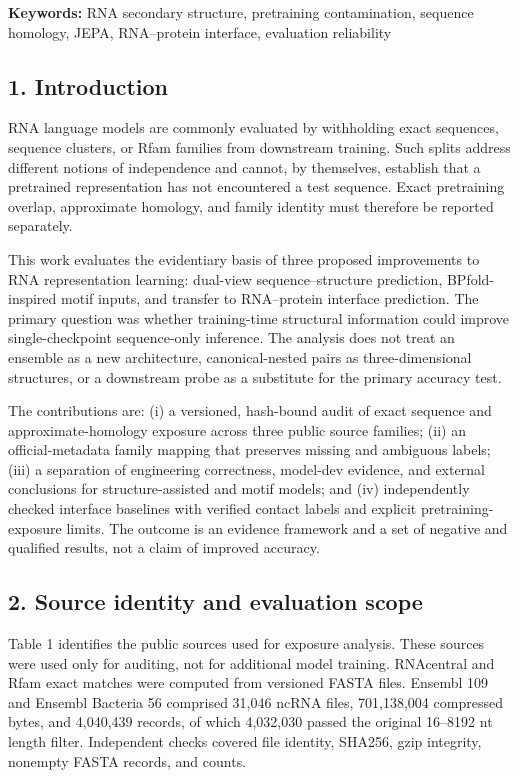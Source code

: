 \documentclass[
  11pt]{article}
\begin{document}
\textbf{Keywords:} RNA secondary structure, pretraining contamination,
sequence homology, JEPA, RNA--protein interface, evaluation reliability

\hypertarget{1-introduction}{%
\subsection{1. Introduction}\label{1-introduction}}

RNA language models are commonly evaluated by withholding exact
sequences, sequence clusters, or Rfam families from downstream training.
Such splits address different notions of independence and cannot, by
themselves, establish that a pretrained representation has not
encountered a test sequence. Exact pretraining overlap, approximate
homology, and family identity must therefore be reported separately.

This work evaluates the evidentiary basis of three proposed improvements
to RNA representation learning: dual-view sequence--structure
prediction, BPfold-inspired motif inputs, and transfer to RNA--protein
interface prediction. The primary question was whether training-time
structural information could improve single-checkpoint sequence-only
inference. The analysis does not treat an ensemble as a new
architecture, canonical-nested pairs as three-dimensional structures, or
a downstream probe as a substitute for the primary accuracy test.

The contributions are: (i) a versioned, hash-bound audit of exact
sequence and approximate-homology exposure across three public source
families; (ii) an official-metadata family mapping that preserves
missing and ambiguous labels; (iii) a separation of engineering
correctness, model-dev evidence, and external conclusions for
structure-assisted and motif models; and (iv) independently checked
interface baselines with verified contact labels and explicit
pretraining-exposure limits. The outcome is an evidence framework and a
set of negative and qualified results, not a claim of improved accuracy.

\hypertarget{2-source-identity-and-evaluation-scope}{%
\subsection{2. Source identity and evaluation
scope}\label{2-source-identity-and-evaluation-scope}}

Table 1 identifies the public sources used for exposure analysis. These
sources were used only for auditing, not for additional model training.
RNAcentral and Rfam exact matches were computed from versioned FASTA
files. Ensembl 109 and Ensembl Bacteria 56 comprised 31,046 ncRNA files,
701,138,004 compressed bytes, and 4,040,439 records, of which 4,032,030
passed the original 16--8192 nt length filter. Independent checks
covered file identity, SHA256, gzip integrity, nonempty FASTA records,
and counts.
\end{document}
